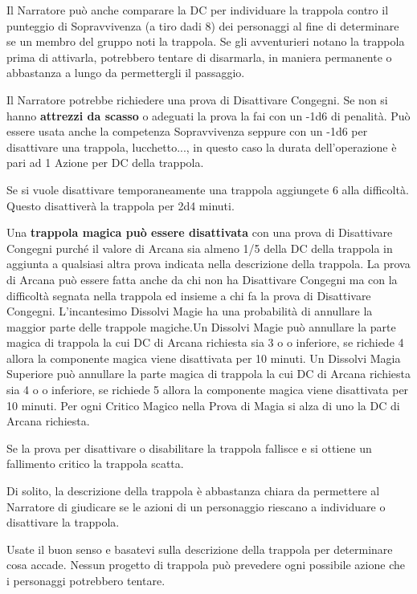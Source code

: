 \begin{multicols}{2}
Il Narratore può anche comparare la DC per individuare la trappola contro il punteggio di Sopravvivenza (a tiro dadi 8) dei personaggi al fine di determinare se un membro del gruppo noti la trappola. Se gli avventurieri notano la trappola prima di attivarla, potrebbero tentare di disarmarla, in maniera permanente o abbastanza a lungo da permettergli il passaggio.

Il Narratore potrebbe richiedere una prova di Disattivare Congegni. Se non si hanno \textbf{attrezzi da scasso} o adeguati la prova la fai con un -1d6 di penalità. Può essere usata anche la competenza Sopravvivenza seppure con un -1d6 per disattivare una trappola, lucchetto..., in questo caso la durata dell'operazione è pari ad 1 Azione per DC della trappola.

Se si vuole disattivare temporaneamente una trappola aggiungete 6 alla difficoltà. Questo disattiverà la trappola per 2d4 minuti.

Una \textbf{trappola magica può essere disattivata} con una prova di Disattivare Congegni purché il valore di Arcana sia almeno 1/5 della DC della trappola in aggiunta a qualsiasi altra prova indicata nella descrizione della trappola. La prova di Arcana può essere fatta anche da chi non ha Disattivare Congegni ma con la difficoltà segnata nella trappola ed insieme a chi fa la prova di Disattivare Congegni. L'incantesimo Dissolvi Magie ha una probabilità di annullare la maggior parte delle trappole magiche.Un Dissolvi Magie può annullare la parte magica di trappola la cui DC di Arcana richiesta sia 3 o o inferiore, se richiede 4 allora la componente magica viene disattivata per 10 minuti. Un Dissolvi Magia Superiore può annullare la parte magica di trappola la cui DC di Arcana richiesta sia 4 o o inferiore, se richiede 5 allora la componente magica viene disattivata per 10 minuti. Per ogni Critico Magico nella Prova di Magia si alza di uno la DC di Arcana richiesta.

Se la prova per disattivare o disabilitare la trappola fallisce e si ottiene un fallimento critico la trappola scatta.

Di solito, la descrizione della trappola è abbastanza chiara da permettere al Narratore di giudicare se le azioni di un personaggio riescano a individuare o disattivare la trappola.

Usate il buon senso e basatevi sulla descrizione della trappola per determinare cosa accade. Nessun progetto di trappola può prevedere ogni possibile azione che i personaggi potrebbero tentare.


\end{multicols}
